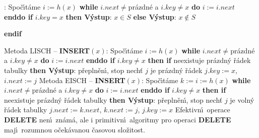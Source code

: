 :\newline 
Spo\v c\'\i t\'ame $i:=h(x)$\newline 
{\bf while} $i.next\ne$pr\'azdn\'e a $i.key\ne x$ {\bf do} $i:=i.next$ {\bf enddo \newline 
if} $i.key=x$ {\bf then V\'ystup}: $x\in S$ {\bf else V\'ystup}: $
x\notin S$ {\bf endif
\medskip

}\flushpar Metoda LISCH -- {\bf INSERT$(x)$}:\newline 
Spo\v c\'\i t\'ame $i:=h(x)$\newline 
{\bf while} $i.next\ne$pr\'azdn\'e a $i.key\ne x$ {\bf do} $i:=i.next$ {\bf enddo \newline 
if} $i.key\ne x$ {\bf then\newline 
\phantom{{\rm ---}}if} neexistuje pr\'azdn\'y \v r\'adek tabulky {\bf then\newline 
\phantom{{\rm ------}}V\'ystup}: p\v repln\v en\'\i , stop\newline 
{}nech\v t $j$ je pr\'azdn\'y \v r\'adek $j.
key:=x$, 
$i.next:=j$\newline 
\phantom{---}{\bf endif\newline 
endif
\medskip

}\flushpar Metoda EISCH -- {\bf INSERT$(x)$}:\newline 
Spo\v c\'\i t\'ame $k:=i:=h(x)$\newline 
{\bf while} $i.next\ne$pr\'azdn\'e a $i.key\ne x$ {\bf do} $i:=i.next$ {\bf enddo \newline 
if} $i.key\ne x$ {\bf then\newline 
\phantom{{\rm ---}}if} neexistuje pr\'azdn\'y \v r\'adek tabulky {\bf then\newline 
\phantom{{\rm ------}}V\'ystup}: p\v repln\v en\'\i , stop\newline 
{}nech\v t $j$ je voln\'y \v r\'adek tabulky\newline 
\phantom{------}$j.next:=k.next$, $k.next:=j$, $j.key:=x$\newline 
\phantom{---}{\bf endif\newline 
endif
\medskip

}\flushpar Efektivn\'\i\ operace {\bf DELETE}  nen\'\i\ zn\'am\'a, ale i primitivn\'\i\ 
algoritmy pro operaci {\bf DELETE} maj\'\i\ rozumnou o\v cek\'avanou 
\v casovou slo\v zitost.
\medskip

